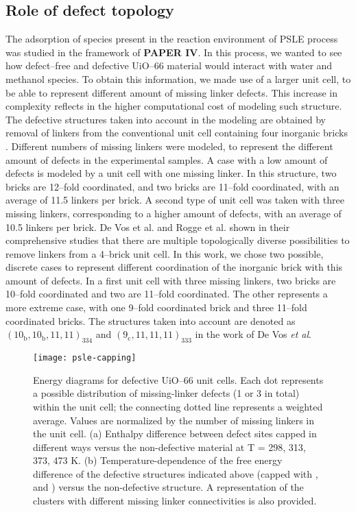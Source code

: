 \subsection*{Role of defect topology}
The adsorption of species present in the reaction environment of PSLE process was studied in the framework of \textbf{PAPER IV}. In this process, we wanted to see how defect--free and defective UiO--66 material would interact with water and methanol species. To obtain this information, we made use of a larger unit cell, to be able to represent different amount of missing linker defects. This increase in complexity reflects in the higher computational cost of modeling such structure. The defective structures taken into account in the modeling are obtained by removal of linkers from the conventional unit cell containing four inorganic  bricks \cite{cavka2008new}. Different numbers of missing linkers were modeled, to represent the different amount of defects in the experimental samples. A case with a low amount of defects is modeled by a unit cell with one missing linker. In this structure, two bricks are 12--fold coordinated, and two bricks are 11--fold coordinated, with an average of 11.5 linkers per brick. A second type of unit cell was taken with three missing linkers, corresponding to a higher amount of defects, with an average of 10.5 linkers per brick. De Vos et al. and Rogge et al.\cite{devos2017missing, rogge2016thermodynamic} shown in their comprehensive studies that there are multiple topologically diverse possibilities to remove linkers from a 4--brick unit cell. In this work, we chose two possible, discrete cases to represent different coordination of the inorganic brick with this amount of defects. In a first unit cell with three missing linkers, two bricks are 10--fold coordinated and two are 11--fold coordinated. The other represents a more extreme case, with one 9--fold coordinated brick and three 11--fold coordinated bricks. The structures taken into account are denoted as $\mathrm{(10_{b}, 10_{b}, 11, 11)_{334}}$ and $\mathrm{(9_{c}, 11, 11, 11)_{333}}$ in the work of De Vos \textit{et al}\cite{devos2017missing}. 
%
\begin{figure}[H]
	\centering
	\texttt{[image: psle-capping]}
	\caption{Energy diagrams for defective UiO--66 unit cells. Each dot represents a possible distribution of missing-linker defects (1 or 3 in total) within the unit cell; the connecting dotted line represents a weighted average. Values are normalized by the number of missing linkers in the unit cell. (a) Enthalpy difference between defect sites capped in different ways versus the non-defective material at T = 298, 313, 373, 473 K. (b) Temperature-dependence of the free energy difference of the defective structures indicated above (capped with ,  and ) versus the non-defective structure. A representation of the clusters with different missing linker connectivities is also provided.}
	\label{fig:psle-capping}
\end{figure}
